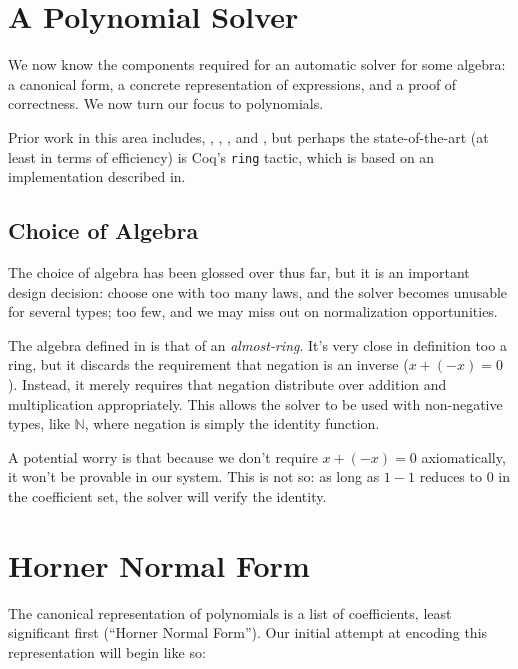 \documentclass[draft, twocolumn]{article}
\theoremstyle{definition}
\theoremstyle{remark}
\begin{document}
\section{A Polynomial Solver}
We now know the components required for an automatic solver for some algebra: a
canonical form, a concrete representation of expressions, and a proof of
correctness. We now turn our focus to polynomials.

Prior work in this area includes\cite{geuvers_automatically_2017},
\cite{meshveliani_dependent_2013}, \cite{zalakain_evidence-providing_2017},
\cite{cheng_functional_2018}, and \cite{russino_polynomial_2017}, but perhaps
the state-of-the-art (at least in terms of efficiency) is Coq's \texttt{ring}
tactic\cite{the_coq_development_team_2018_1219885}, which is based on an
implementation described in\cite{hutchison_proving_2005}.
\subsection{Choice of Algebra}
The choice of algebra has been glossed over thus far, but it is an important
design decision: choose one with too many laws, and the solver becomes unusable
for several types; too few, and we may miss out on normalization opportunities.

The algebra defined in \cite{hutchison_proving_2005} is that of an
\emph{almost-ring}. It's very close in definition too a ring, but it discards
the requirement that negation is an inverse (\(x + (-x) = 0\)). Instead, it
merely requires that negation distribute over addition and multiplication
appropriately. This allows the solver to be used with non-negative types, like
\(\mathbb{N}\), where negation is simply the identity function.

A potential worry is that because we don't require \(x + (-x) = 0\)
axiomatically, it won't be provable in our system. This is not so: as long as
\(1 - 1\) reduces to \(0\) in the coefficient set, the solver will verify the
identity.
\section{Horner Normal Form}
The canonical representation of polynomials is a list of coefficients, least
significant first (``Horner Normal Form''). Our initial attempt at encoding this
representation will begin like so:
\end{document}
